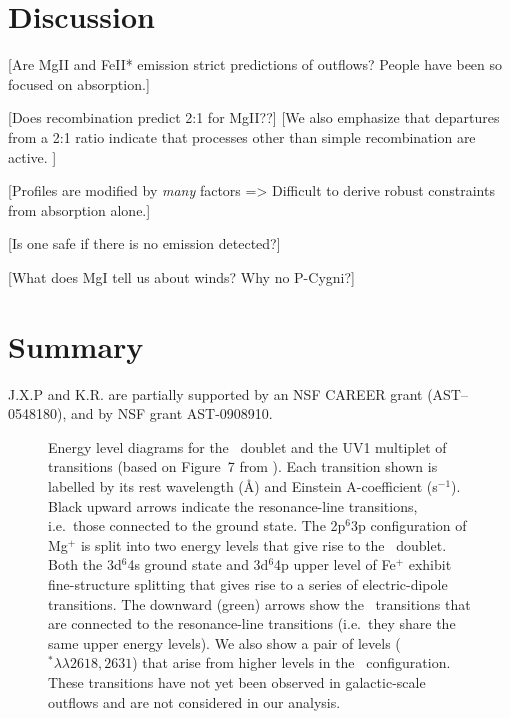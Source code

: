 \documentclass[12pt,preprint]{aastex}
\begin{document}
\section{Discussion}
\label{sec:discuss}

[Are MgII and FeII* emission strict predictions of outflows?  People
have been so focused on absorption.]

[Does recombination predict 2:1 for MgII??]
[We also emphasize that departures from a 2:1
ratio indicate that processes other than simple recombination are
active. ]

[Profiles are modified by {\it many} factors => Difficult to derive
robust constraints from absorption alone.]

[Is one safe if there is no emission detected?]

[What does MgI tell us about winds?  Why no P-Cygni?]

\section{Summary}
\label{sec:summary}

\acknowledgments

J.X.P and K.R. are partially supported
by an NSF CAREER grant (AST--0548180), and 
by NSF grant AST-0908910.

\clearpage

%
%



\clearpage







\begin{figure}
\caption{
Energy level diagrams for the \mgiid\ doublet and the UV1
multiplet of  transitions   
(based on Figure~7 from \cite{hmt+99}).
Each transition shown is
labelled by its rest wavelength (\AA) and Einstein A-coefficient
(s$^{-1}$). Black upward arrows
indicate the resonance-line transitions, i.e.\ those connected to the ground
state.  The 2p$^6$3p configuration of Mg$^+$ is split into
two energy levels that give rise to the \mgiid\ doublet.  
Both the 3d$^6$4s ground state and 3d$^6$4p upper level of Fe$^+$
exhibit fine-structure splitting that gives rise to a series of
electric-dipole transitions. 
The downward (green) arrows show the \feiis\ transitions that are connected to the
resonance-line transitions (i.e.\ they share the same upper energy
levels).  We also show a pair of levels ($^* \lambda\lambda
2618,2631$) that arise from higher levels in the \zconfig\
configuration.  These transitions have not yet been observed in
galactic-scale outflows and are not considered in our analysis.
}
\label{fig:energy}
\end{figure}
\end{document}
